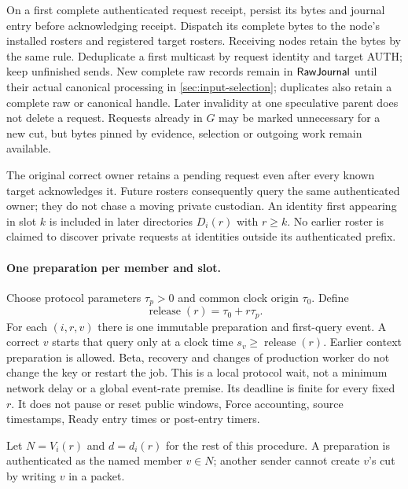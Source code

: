 On a first complete authenticated request receipt, persist its bytes
and journal entry before acknowledging receipt. Dispatch its complete
bytes to the node's installed rosters and registered target rosters.
Receiving nodes retain the bytes by the same rule. Deduplicate a first
multicast by request identity and target AUTH; keep unfinished sends.
New complete raw records remain in $\mathsf{RawJournal}$ until their
actual canonical processing in \cref{sec:input-selection}; duplicates
also retain a complete raw or canonical handle. Later invalidity at one
speculative parent does not delete a request. Requests already in $G$
may be marked unnecessary for a new cut, but bytes pinned by evidence,
selection or outgoing work remain available.

The original correct owner retains a pending request even after every
known target acknowledges it. Future rosters consequently query the
same authenticated owner; they do not chase a moving private custodian.
An identity first appearing in slot $k$ is included in later directories
$D_i(r)$ with $r\ge k$. No earlier roster is claimed to discover private
requests at identities outside its authenticated prefix.

\paragraph{One preparation per member and slot.}
Choose protocol parameters $\tau_p>0$ and common clock origin $\tau_0$.
Define
\[
 \operatorname{release}(r)=\tau_0+r\tau_p.
\]
For each $(i,r,v)$ there is one immutable preparation and first-query
event. A correct $v$ starts that query only at a clock time
$s_v\ge\operatorname{release}(r)$. Earlier context preparation is
allowed. Beta, recovery and changes of production worker do not change
the key or restart the job. This is a local protocol wait, not a
minimum network delay or a global event-rate premise. Its deadline is
finite for every fixed $r$. It does not pause or reset public windows,
Force accounting, source timestamps, Ready entry times or post-entry
timers.

Let $N=V_i(r)$ and $d=d_i(r)$ for the rest of this procedure. A
preparation is authenticated as the named member $v\in N$; another
sender cannot create $v$'s cut by writing $v$ in a packet.

